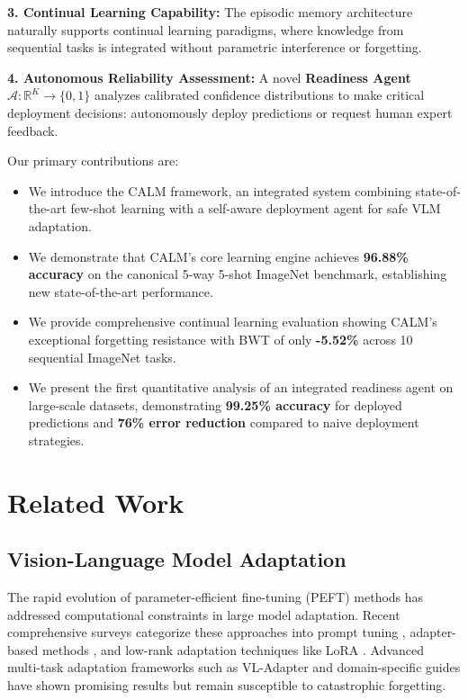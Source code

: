 \documentclass[conference]{IEEEtran}
\begin{document}
\textbf{3. Continual Learning Capability:} The episodic memory architecture naturally supports continual learning paradigms, where knowledge from sequential tasks is integrated without parametric interference or forgetting.

\textbf{4. Autonomous Reliability Assessment:} A novel \textbf{Readiness Agent} $\mathcal{A}: \mathbb{R}^K \rightarrow \{0,1\}$ analyzes calibrated confidence distributions to make critical deployment decisions: autonomously deploy predictions or request human expert feedback.

Our primary contributions are:

\begin{itemize}
\item We introduce the CALM framework, an integrated system combining state-of-the-art few-shot learning with a self-aware deployment agent for safe VLM adaptation.
\item We demonstrate that CALM's core learning engine achieves \textbf{96.88\% accuracy} on the canonical 5-way 5-shot ImageNet benchmark, establishing new state-of-the-art performance.
\item We provide comprehensive continual learning evaluation showing CALM's exceptional forgetting resistance with BWT of only \textbf{-5.52\%} across 10 sequential ImageNet tasks.
\item We present the first quantitative analysis of an integrated readiness agent on large-scale datasets, demonstrating \textbf{99.25\% accuracy} for deployed predictions and \textbf{76\% error reduction} compared to naive deployment strategies.
\end{itemize}

\section{Related Work}

\subsection{Vision-Language Model Adaptation}

The rapid evolution of parameter-efficient fine-tuning (PEFT) methods has addressed computational constraints in large model adaptation. Recent comprehensive surveys \cite{he2024survey} categorize these approaches into prompt tuning \cite{lester2021power}, adapter-based methods \cite{houlsby2019parameter}, and low-rank adaptation techniques like LoRA \cite{hu2022lora}. Advanced multi-task adaptation frameworks such as VL-Adapter \cite{wang2024vl} and domain-specific guides \cite{chen2024train} have shown promising results but remain susceptible to catastrophic forgetting.
\end{document}
